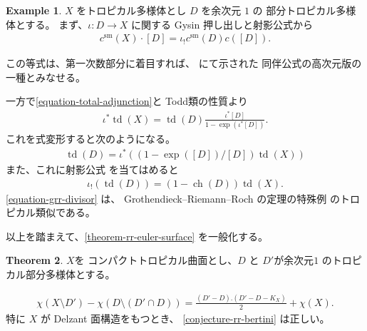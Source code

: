 \documentclass[a4paper,dvipdfmx,reqno,12pt]{amsart}
\theoremstyle{definition}
\newtheorem{theorem}{Theorem}[section]
\newtheorem{example}[theorem]{Example}
\newcommand{\opn}[1]{\operatorname{#1}}
\numberwithin{equation}{section}
\begin{document}
\begin{example}
     
$X$ をトロピカル多様体とし $D$ を余次元 $1$ の
部分トロピカル多様体とする。
まず、$\iota\colon D\to X$ に関する
Gysin 押し出しと射影公式から
\begin{align}
c^{\mathrm{sm}}(X)\cdot [D]=\iota_!c^{\mathrm{sm}}(D)c([D]).
\end{align}

この等式は、第一次数部分に着目すれば、
\cite[Theorem 5.2]{demedrano2023chern}にて示された
同伴公式の高次元版の一種とみなせる。

一方で\eqref{equation-total-adjunction}と
Todd類の性質より
\begin{align}
\iota^{*}\opn{td}(X)=
\opn{td}(D)\frac{\iota^{*}[D]}{1-\opn{exp}(\iota^{*}[D])}.
\end{align}
これを式変形すると次のようになる。
\begin{align}
\opn{td}(D)
=\iota^{*}((1-\opn{exp}([D])/[D])\opn{td}(X))
\end{align}
また、これに射影公式
\cite[Proposition 4.18]{gross2019sheaftheoretic}
を当てはめると
\begin{align}
\label{equation-grr-divisor}
\iota_!(\opn{td}(D))=(1-\opn{ch}(D))\opn{td}(X).
\end{align}
\eqref{equation-grr-divisor} は、
Grothendieck--Riemann--Roch の定理の特殊例
のトロピカル類似である。

\end{example}

以上を踏まえて、\cref{theorem-rr-euler-surface}
を一般化する。

\begin{theorem}
\label{theorem-rr-bertini-surface}
$X$を
コンパクトトロピカル曲面とし、$D$ と $D'$が余次元$1$
のトロピカル部分多様体とする。

\begin{align}
\chi(X\setminus D')-\chi(D\setminus (D'\cap D))
=\frac{(D'-D).(D'-D-K_X)}{2}+\chi(X).
\end{align}
特に $X$ が Delzant 面構造をもつとき、
\cref{conjecture-rr-bertini} は正しい。
\end{theorem}
\end{document}
